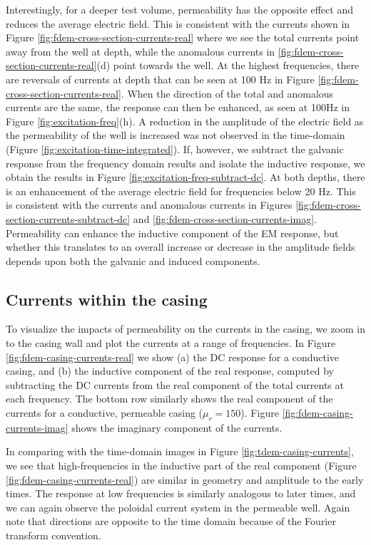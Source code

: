 \documentclass[onecolumn, extra, mreferee]{gji}
\begin{document}


Interestingly, for a deeper test volume, permeability has the opposite effect and reduces the average electric field. This is consistent with the currents shown in Figure \ref{fig:fdem-cross-section-currents-real} where we see the total currents point away from the well at depth, while the anomalous currents in \ref{fig:fdem-cross-section-currents-real}(d) point towards the well. At the highest frequencies, there are reversals of currents at depth that can be seen at 100 Hz in Figure \ref{fig:fdem-cross-section-currents-real}. When the direction of the total and anomalous currents are the same, the response can then be enhanced, as seen at 100Hz in Figure \ref{fig:excitation-freq}(h). A reduction in the amplitude of the electric field as the permeability of the well is increased was not observed in the time-domain (Figure \ref{fig:excitation-time-integrated}). If, however, we subtract the galvanic response from the frequency domain results and isolate the inductive response, we obtain the results in Figure \ref{fig:excitation-freq-subtract-dc}. At both depths, there is an enhancement of the average electric field for frequencies below 20 Hz. This is consistent with the currents and anomalous currents in Figures \ref{fig:fdem-cross-section-currents-subtract-dc} and \ref{fig:fdem-cross-section-currents-imag}. Permeability can enhance the inductive component of the EM response, but whether this translates to an overall increase or decrease in the amplitude fields depends upon both the galvanic and induced components.




\subsection{Currents within the casing}
To visualize the impacts of permeability on the currents in the casing, we zoom in to the casing wall and plot the currents at a range of frequencies. In Figure \ref{fig:fdem-casing-currents-real} we show (a) the DC response for a conductive casing, and (b) the inductive component of the real response, computed by subtracting the DC currents from the real component of the total currents at each frequency. The bottom row similarly shows the real component of the currents for a conductive, permeable casing ($\mu_r = 150$). Figure \ref{fig:fdem-casing-currents-imag} shows the imaginary component of the currents.

In comparing with the time-domain images in Figure \ref{fig:tdem-casing-currents}, we see that high-frequencies in the inductive part of the real component (Figure \ref{fig:fdem-casing-currents-real}) are similar in geometry and amplitude to the early times. The response at low frequencies is similarly analogous to later times, and we can again observe the poloidal current system in the permeable well. Again note that directions are opposite to the time domain because of the Fourier transform convention.
\end{document}
